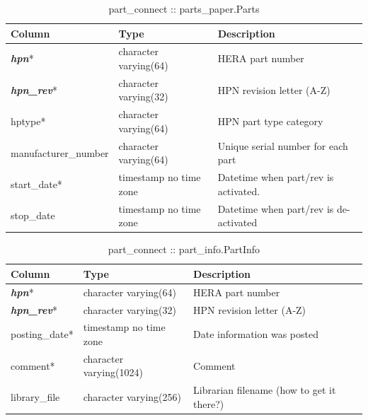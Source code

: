 \documentclass{article}
\begin{document}
\begin{table}[h]
\centering
\caption{part\_connect :: parts\_paper.Parts}
\begin{tabular}{| l | l | l |} \hline
{\bf Column} & {\bf Type} & {\bf Description} \\ \hline
{\bf \em hpn}* & character varying(64) & HERA part number \\ \hline
{\bf \em hpn\_rev}* & character varying(32) & HPN revision letter (A-Z) \\ \hline
hptype*  &  character varying(64) & HPN part type category \\ \hline
manufacturer\_number & character varying(64) & Unique serial number for each part \\ \hline
start\_date* & timestamp no time zone & Datetime when part/rev is activated. \\ \hline
stop\_date & timestamp no time zone & Datetime when part/rev is de-activated \\ \hline
\end{tabular}
\end{table}

\begin{table}[h]
\centering
\caption{part\_connect :: part\_info.PartInfo}
\begin{tabular}{| l | l | l |} \hline
{\bf Column} & {\bf Type} & {\bf Description} \\ \hline
{\bf \em hpn}* & character varying(64) & HERA part number \\ \hline
{\bf \em hpn\_rev}* & character varying(32) & HPN revision letter (A-Z) \\ \hline
posting\_date* & timestamp no time zone & Date information was posted \\ \hline
comment* &  character varying(1024) & Comment \\ \hline
library\_file & character varying(256) &  Librarian filename (how to get it there?) \\ \hline
\end{tabular}
\end{table}
\end{document}
